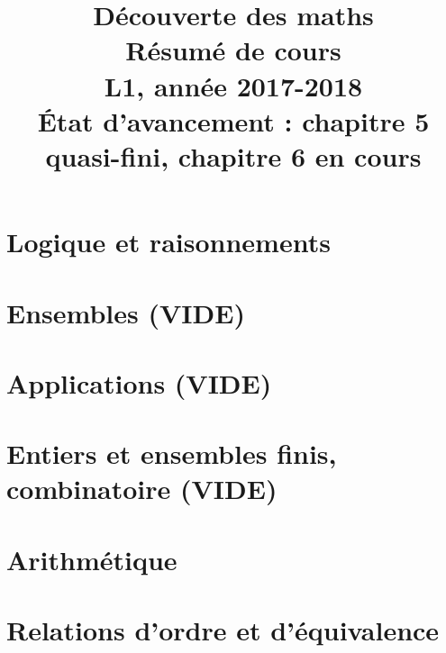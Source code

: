 \documentclass[11pt,a4paper]{book}
\theoremstyle{definition}
\begin{document}
\title{Découverte des maths\\
Résumé de cours\\
L1, année 2017-2018\\
{\small 
\'Etat d'avancement : chapitre 5 quasi-fini, chapitre 6 en cours}}
\maketitle


\tableofcontents





\chapter{Logique et raisonnements}


\chapter{Ensembles (VIDE)}


\chapter{Applications (VIDE)}


\chapter{Entiers et ensembles finis, combinatoire (VIDE)}


\chapter{Arithmétique}


\chapter{Relations d'ordre et d'équivalence}

\end{document}
